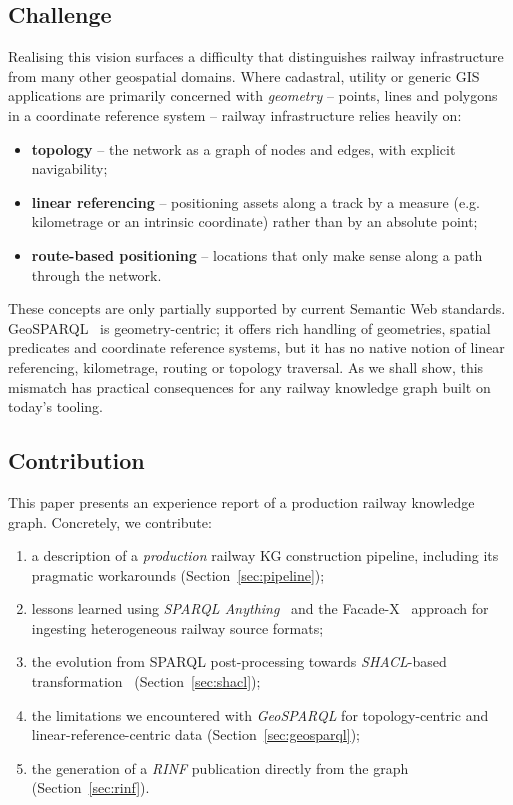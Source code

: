 \documentclass[twocolumn]{ceurart}
\begin{document}
\subsection{Challenge}

Realising this vision surfaces a difficulty that distinguishes railway
infrastructure from many other geospatial domains. Where cadastral, utility or
generic GIS applications are primarily concerned with \emph{geometry} -- points,
lines and polygons in a coordinate reference system -- railway infrastructure
relies heavily on:

\begin{itemize}
  \item \textbf{topology} -- the network as a graph of nodes and edges, with
        explicit navigability;
  \item \textbf{linear referencing} -- positioning assets along a track by a
        measure (e.g. kilometrage or an intrinsic coordinate) rather than by an
        absolute point;
  \item \textbf{route-based positioning} -- locations that only make sense along
        a path through the network.
\end{itemize}

These concepts are only partially supported by current Semantic Web standards.
GeoSPARQL~\cite{geosparql} is geometry-centric; it offers rich handling of
geometries, spatial predicates and coordinate reference systems, but it has no
native notion of linear referencing, kilometrage, routing or topology
traversal. As we shall show, this mismatch has practical consequences for any
railway knowledge graph built on today's tooling.

\subsection{Contribution}

This paper presents an experience report of a production railway knowledge
graph. Concretely, we contribute:

\begin{enumerate}
  \item a description of a \emph{production} railway KG construction pipeline,
        including its pragmatic workarounds (Section~\ref{sec:pipeline});
  \item lessons learned using \emph{SPARQL Anything}~\cite{sparqlanything} and
        the Facade-X~\cite{facadex} approach for ingesting heterogeneous
        railway source formats;
  \item the evolution from SPARQL post-processing towards \emph{SHACL}-based
        transformation~\cite{shacl,shaclaf} (Section~\ref{sec:shacl});
  \item the limitations we encountered with \emph{GeoSPARQL} for
        topology-centric and linear-reference-centric data
        (Section~\ref{sec:geosparql});
  \item the generation of a \emph{RINF} publication directly from the graph
        (Section~\ref{sec:rinf}).
\end{enumerate}
\end{document}
